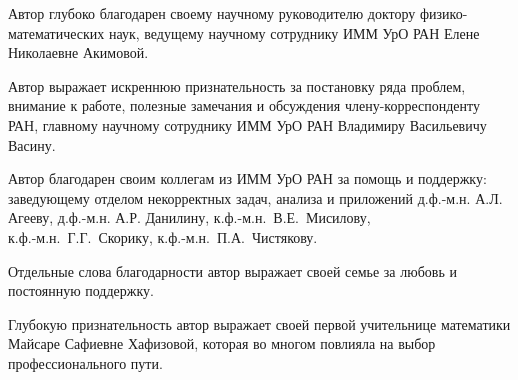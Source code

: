 Автор глубоко благодарен своему научному руководителю доктору физико-математических наук, ведущему научному сотруднику ИММ УрО РАН Елене Николаевне Акимовой.

Автор выражает искреннюю признательность за постановку ряда проблем, внимание к работе, полезные замечания и обсуждения члену-корреспонденту РАН, главному научному сотруднику ИММ УрО РАН Владимиру Васильевичу Васину.

Автор благодарен своим коллегам из ИММ УрО РАН за помощь и поддержку: заведующему отделом некорректных задач, анализа и приложений д.ф.-м.н. А.Л. Агееву, д.ф.-м.н. А.Р. Данилину, к.ф.-м.н.~В.Е.~Мисилову, \\к.ф.-м.н.~Г.Г.~Скорику, к.ф.-м.н.~П.А.~Чистякову.

Отдельные слова благодарности автор выражает своей семье за любовь и постоянную поддержку.

Глубокую признательность автор выражает своей первой учительнице математики Майсаре Сафиевне Хафизовой, которая во многом повлияла на выбор профессионального пути.


